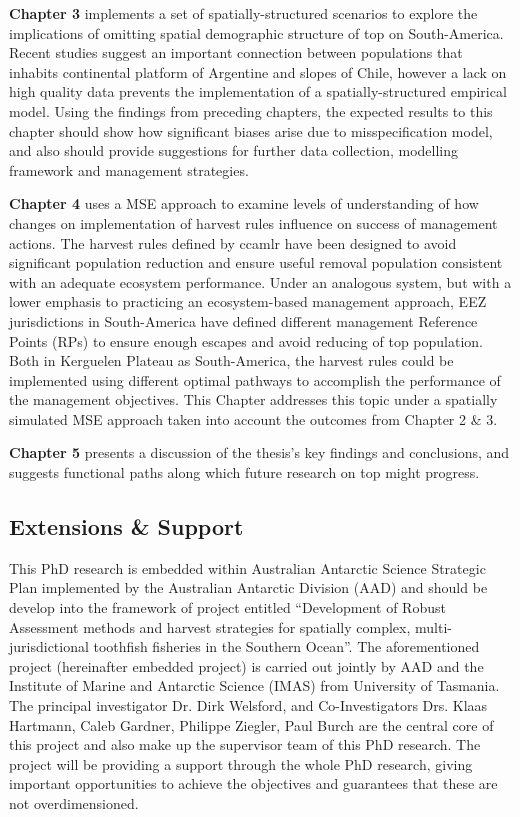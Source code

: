 \textbf{Chapter 3} implements a set of spatially-structured scenarios to explore the implications of omitting spatial demographic structure of \acl{top} on South-America. Recent studies suggest an important connection between  populations that inhabits continental platform of Argentine and slopes of Chile, however a lack on high quality data prevents the implementation of a  spatially-structured empirical model. Using the findings from preceding chapters, the expected results to this chapter should show how significant biases arise due to misspecification model, and also should provide suggestions for further data collection, modelling framework and management strategies.

\textbf{Chapter 4} uses a MSE approach to examine levels of understanding of how changes on implementation of harvest rules influence on success of management actions. The harvest rules defined by \ac{ccamlr} have been designed to avoid significant population reduction and ensure useful removal population consistent with an adequate ecosystem performance. Under an analogous system, but with a lower emphasis to practicing an ecosystem-based management approach, EEZ jurisdictions in South-America have defined different management Reference Points (RPs) to ensure enough escapes and avoid reducing of \acl{top} population. Both in Kerguelen Plateau as South-America, the harvest rules could be implemented using different optimal pathways to accomplish the performance of the management objectives. This Chapter addresses this topic under a spatially simulated MSE approach taken into account the outcomes from Chapter 2 \& 3.

\textbf{Chapter 5} presents a discussion of the thesis’s key findings and conclusions, and suggests functional paths along which future research on \acl{top} might progress.


\subsection*{Extensions \& Support}
\label{subsec:extsupp}
    
This PhD research is embedded within Australian Antarctic Science Strategic Plan implemented by the Australian Antarctic Division (AAD) and should be develop into the framework of project entitled ``Development of Robust Assessment methods and harvest strategies for spatially complex, multi-jurisdictional toothfish fisheries in the Southern Ocean''. The aforementioned project (hereinafter embedded project) is carried out jointly by AAD and the Institute of Marine and Antarctic Science (IMAS) from University of Tasmania. The principal investigator Dr. Dirk Welsford, and Co-Investigators Drs. Klaas Hartmann, Caleb Gardner, Philippe Ziegler, Paul Burch are the central core of this project and also make up  the supervisor team  of this PhD research. The project will be providing a support through the whole PhD research, giving important opportunities to achieve the objectives and guarantees that these are not overdimensioned.

\vspace{5cm}
